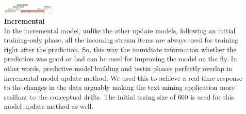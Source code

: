 \\
\\
\includegraphics[width=0.2\textwidth]{./time_models/Errortriggered}\\
\textbf{\large Incremental}\\
In the incremental model, unlike the other update models, following an initial training-only phase, all the incoming stream items are always used for training right after the prediction. So, this way the immidiate information whether the prediction was good or bad can be used for improving the model on the fly. In other words, predictive model building and testin phases perfectly overlap in incremental model update method. We used this to achieve a real-time response to the changes in the data arguably making the text mining application more resillant to the conceptual drifts. The initial traing size of 600 is used for this model update method as well.

